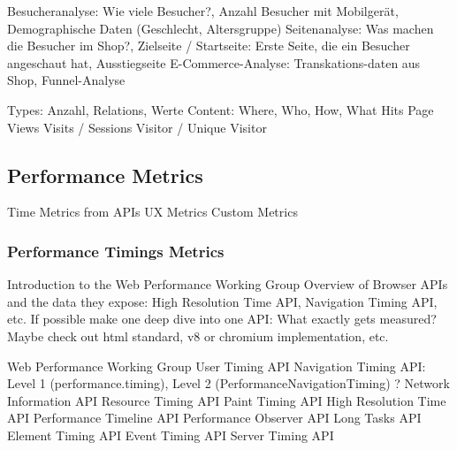  Besucheranalyse: Wie viele Besucher?, Anzahl Besucher mit Mobilgerät, Demographische Daten (Geschlecht, Altersgruppe)
 Seitenanalyse: Was machen die Besucher im Shop?, Zielseite / Startseite: Erste Seite, die ein Besucher angeschaut hat, Ausstiegseite
 E-Commerce-Analyse: Transkations-daten aus Shop, Funnel-Analyse


 Types: Anzahl, Relations, Werte
 Content: Where, Who, How, What
 Hits
 Page Views
 Visits / Sessions
 Visitor / Unique Visitor











\subsection{Performance Metrics}


Time Metrics from APIs
UX Metrics
Custom Metrics







\subsubsection{Performance Timings Metrics}

 Introduction to the Web Performance Working Group
 Overview of Browser APIs and the data they expose: High Resolution Time API, Navigation Timing API, etc.
 If possible make one deep dive into one API: What exactly gets measured? Maybe check out html standard, v8 or chromium implementation, etc.














		 Web Performance Working Group
		 User Timing API
		 Navigation Timing API: Level 1 (performance.timing), Level 2 (PerformanceNavigationTiming) ?
		 Network Information API
		 Resource Timing API
		 Paint Timing API
		 High Resolution Time API
		 Performance Timeline API
		 Performance Observer API
		 Long Tasks API
		 Element Timing API
		 Event Timing API
		 Server Timing API



